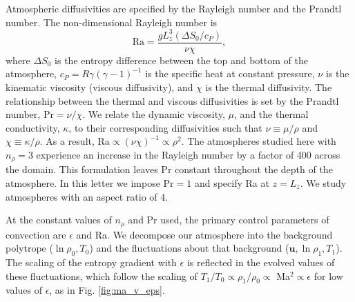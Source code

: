 \documentclass[aps, prl, twocolumn, nofootinbib, groupedaddress, amsfonts, amssymb, amsmath]{revtex4-1}
\begin{document}
Atmospheric diffusivities are specified by the Rayleigh number and the Prandtl number.  The
non-dimensional Rayleigh number is
\begin{equation}
\text{Ra} = \frac{g L_z^3 (\Delta S_0 / c_P)}{\nu\chi},
\end{equation}
where $\Delta S_0$ is the entropy difference between the top and bottom of the atmosphere, 
$c_P = R\gamma(\gamma-1)^{-1}$ is the specific heat at constant pressure,
$\nu$ is the kinematic viscosity (viscous diffusivity), and $\chi$ is the thermal diffusivity.  
The relationship between the thermal and viscous diffusivities is
set by the Prandtl number, Pr$ = \nu/\chi$.   We relate the dynamic viscosity, $\mu$, and the thermal conductivity,
$\kappa$, to their corresponding diffusivities such that 
$\nu \equiv \mu/\rho$ and $\chi \equiv \kappa/\rho$.  As a result, $\text{Ra} \propto (\nu\chi)^{-1} \propto
\rho^2$.  The atmospheres studied here with $n_{\rho} = 3$ experience an increase in the Rayleigh number 
by a factor of 400 across the domain.  This formulation leaves Pr
constant throughout the depth of the atmosphere. In this letter we impose $\text{Pr} = 1$ and
specify Ra at $z = L_z$.  We study atmospheres with an aspect ratio of 4.

At the constant values of $n_\rho$ and Pr used, the primary control parameters of convection are $\epsilon$
and Ra.  We decompose our atmosphere into the background polytrope ($\ln\rho_{0}, T_{0}$) and the fluctuations
about that background ($\bm{u}, \ln\rho_{1}, T_{1}$).  The scaling of the entropy gradient with $\epsilon$
is reflected in the evolved values of these fluctuations, which follow the scaling of
$T_1/T_0 \propto \rho_{1}/\rho_{0} \propto$ Ma$^{2} \propto \epsilon$ for low values of $\epsilon$,
as in Fig. \ref{fig:ma_v_eps}.  
\end{document}
